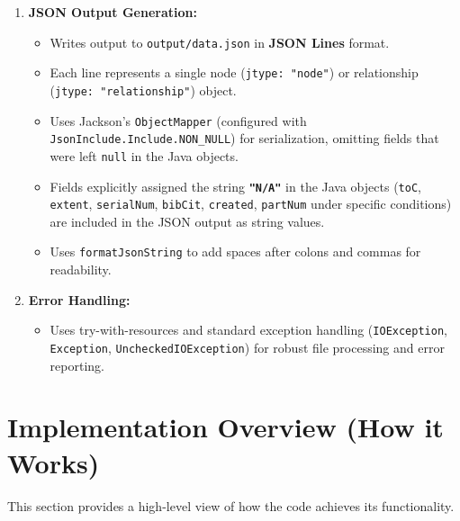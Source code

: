 \documentclass[11pt, a4paper]{article}
\begin{document}
\begin{enumerate}
    \item \textbf{JSON Output Generation:}
        \begin{itemize}
            \item Writes output to \texttt{output/data.json} in \textbf{JSON Lines} format.
            \item Each line represents a single node (\texttt{jtype: "node"}) or relationship (\texttt{jtype: "relationship"}) object.
            \item Uses Jackson's \texttt{ObjectMapper} (configured with \texttt{JsonInclude.Include.NON\_NULL}) for serialization, omitting fields that were left \texttt{null} in the Java objects.
            \item Fields explicitly assigned the string \textbf{\texttt{"N/A"}} in the Java objects (\texttt{toC}, \texttt{extent}, \texttt{serialNum}, \texttt{bibCit}, \texttt{created}, \texttt{partNum} under specific conditions) are included in the JSON output as string values.
            \item Uses \texttt{formatJsonString} to add spaces after colons and commas for readability.
        \end{itemize}

    \item \textbf{Error Handling:}
        \begin{itemize}
            \item Uses try-with-resources and standard exception handling (\texttt{IOException}, \texttt{Exception}, \texttt{UncheckedIOException}) for robust file processing and error reporting.
        \end{itemize}
\end{enumerate}

\section{Implementation Overview (How it Works)}
This section provides a high-level view of how the code achieves its functionality.
\end{document}
